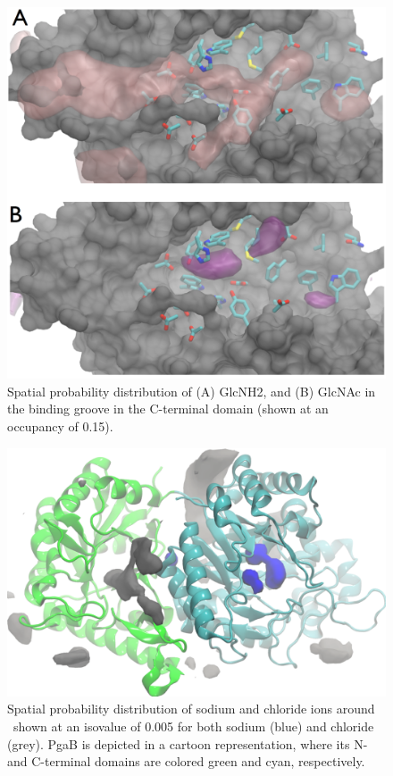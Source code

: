 \begin{figure}[htbp]
\centering
\includegraphics[width=6.25in]{figures/results4/cterm_groove_surf.pdf}
\caption[Spatial probability densities of GlcNAc and GlcNH3+ in the C-terminal groove]{Spatial probability distribution of (A) GlcNH2, and (B) GlcNAc in the binding groove in the C-terminal domain (shown at an occupancy of 0.15).}
\label{fig:groove}
\end{figure}

\begin{figure}[htbp]
\centering
\includegraphics[width=6.25in]{figures/results4/pgab_glucosamine_salt_densities.pdf}
\caption[Ionic distribution]{Spatial probability distribution of sodium and chloride ions around \pgab\ shown at an isovalue of 0.005 for both sodium (blue) and chloride (grey). PgaB is depicted in a cartoon representation, where its N- and C-terminal domains are colored green and cyan, respectively.}
\label{fig:salt_density_distribution}
\end{figure}

